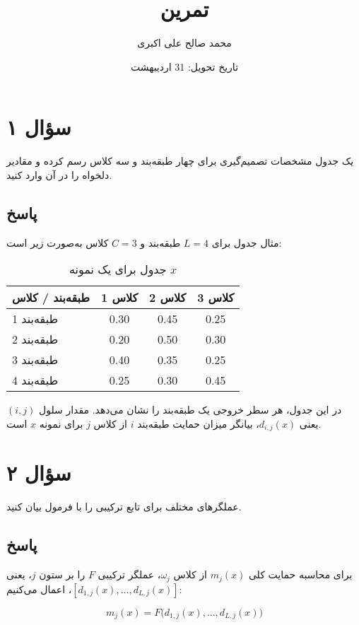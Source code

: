 \documentclass[12pt]{article}
\title{تمرین \lr{Profile Decision}}
\author{محمد صالح علی اکبری}
\date{تاریخ تحویل: 31 اردیبهشت}
\begin{document}
	
	\maketitle
	
	\section*{سؤال ۱}
	یک جدول مشخصات تصمیم‌گیری  برای چهار طبقه‌بند و سه کلاس رسم کرده و مقادیر دلخواه را در آن وارد کنید.
	
	\subsection*{پاسخ}
	مثال جدول  برای \(L=4\) طبقه‌بند و \(C=3\) کلاس به‌صورت زیر است:
	
	\begin{table}[h!]
		\centering
		\caption{جدول  برای یک نمونه \(x\)}
		\begin{tabular}{lccc}
			\hline
			\textbf{طبقه‌بند / کلاس} & \textbf{کلاس 1} & \textbf{کلاس 2} & \textbf{کلاس 3} \\
			\hline
			طبقه‌بند 1 & 0.30 & 0.45 & 0.25 \\
			طبقه‌بند 2 & 0.20 & 0.50 & 0.30 \\
			طبقه‌بند 3 & 0.40 & 0.35 & 0.25 \\
			طبقه‌بند 4 & 0.25 & 0.30 & 0.45 \\
			\hline
		\end{tabular}
	\end{table}
	
	در این جدول، هر سطر خروجی یک طبقه‌بند را نشان می‌دهد. مقدار سلول \((i,j)\) یعنی \(d_{i,j}(x)\)، بیانگر میزان حمایت طبقه‌بند \(i\) از کلاس \(j\) برای نمونه \(x\) است.
	
	\section*{سؤال ۲}
	عملگرهای مختلف برای تابع ترکیبی  را با فرمول بیان کنید.
	
	\subsection*{پاسخ}
	برای محاسبه حمایت کلی \(m_j(x)\) از کلاس \(\omega_j\)، عملگر ترکیبی \(F\) را بر ستون \(j\)، یعنی \([d_{1,j}(x),\dots,d_{L,j}(x)]\)، اعمال می‌کنیم:
	
	\[
	m_j(x)=F\bigl(d_{1,j}(x),\dots,d_{L,j}(x)\bigr)
	\]
	
\end{document}
